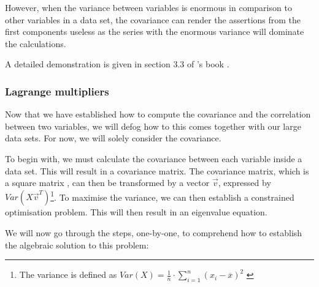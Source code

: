 However, when the variance between variables is enormous in comparison to other variables in a data set, the covariance can render the assertions from the first components useless as the series with the enormous variance will dominate the calculations.

A detailed demonstration is given in section 3.3 of \citeauthor{brunton2019data}'s book  \cite{brunton2019data}.


\clearpage



\subsubsection{Lagrange multipliers}

Now that we have established how to compute the covariance and the correlation between two variables, we will defog how to this comes together with our large data sets.
For now, we will solely consider the covariance.

To begin with, we must calculate the covariance between each variable inside a data set.
This will result in a covariance matrix.
The covariance matrix, which is a square matrix \cite{PythonMachineLearningCh1}, can then be transformed by a vector $\overrightarrow{v}$, expressed by $Var(X\overrightarrow{v}^T)$\footnote{%
	The variance is defined as $Var(X) = \frac{1}{n} \cdot \displaystyle\sum_{i=1}^{n} (x_i - \overline{x})^2$ \cite{deisenroth2020mathematics}
}.
To maximise the variance, we can then establish a constrained optimisation problem.
This will then result in an eigenvalue equation.
\bigskip


We will now go through the steps, one-by-one, to comprehend how to establish the algebraic solution to this problem:


